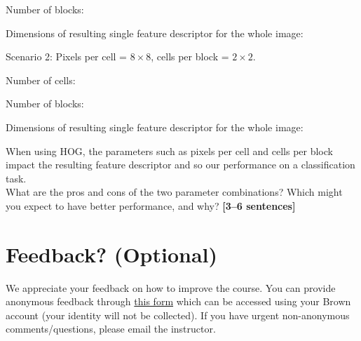 \documentclass{csci1430}
\begin{document}
\begin{answer}
Number of blocks:
\end{answer} 
    
\begin{answer}[height=3]
Dimensions of resulting single feature descriptor for the whole image:
\end{answer} 


\begin{subquestion}[points=3]
Scenario 2: Pixels per cell = $8\times8$, cells per block = $2\times2$.
\end{subquestion}

\begin{answer}
Number of cells:
\end{answer} 

\begin{answer}
Number of blocks:
\end{answer} 
    
\begin{answer}[height=3]
Dimensions of resulting single feature descriptor for the whole image:
\end{answer}


\pagebreak
\begin{subquestion}[points=4]
When using HOG, the parameters such as pixels per cell and cells per block impact the resulting feature descriptor and so our performance on a classification task. \\

What are the pros and cons of the two parameter combinations? Which might you expect to have better performance, and why? \textbf{[3--6 sentences]}
\end{subquestion}

\begin{answer}[height=10]

\end{answer}




\pagebreak
\section*{Feedback? (Optional)}
We appreciate your feedback on how to improve the course. You can provide anonymous feedback through \href{https://forms.gle/Eu5jJbDUmLknAyJV9}{this form} which can be accessed using your Brown account (your identity will not be collected). If you have urgent non-anonymous comments/questions, please email the instructor.


\end{document}
